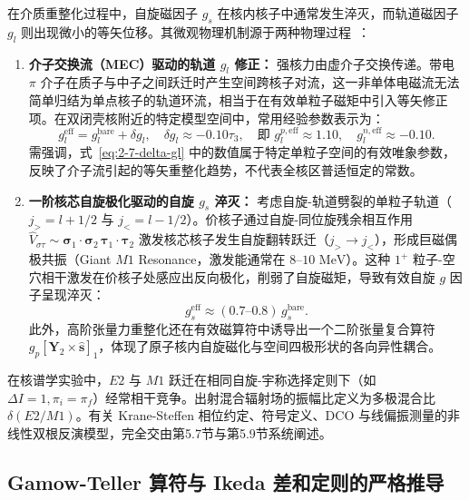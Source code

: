 在介质重整化过程中，自旋磁因子 $g_s$ 在核内核子中通常发生淬灭，而轨道磁因子 $g_l$ 则出现微小的等矢位移。其微观物理机制源于两种物理过程~\cite{book-suhonen-from-nucleons-to-nucleus,book-bohr-mottelson-nuclear-structure}：
\begin{enumerate}
\item \textbf{介子交换流（MEC）驱动的轨道 $g_l$ 修正：} 强核力由虚介子交换传递。带电 $\pi$ 介子在质子与中子之间跃迁时产生空间跨核子对流，这一非单体电磁流无法简单归结为单点核子的轨道环流，相当于在有效单粒子磁矩中引入等矢修正项。在双闭壳核附近的特定模型空间中，常用经验参数表示为：
\begin{equation}\label{eq:2-7-delta-gl}
g_l^{\mathrm{eff}} = g_l^{\mathrm{bare}} + \delta g_l, \quad \delta g_l \approx -0.10 \tau_3, \quad \text{即 } g_l^{p,\mathrm{eff}} \approx 1.10, \quad g_l^{n,\mathrm{eff}} \approx -0.10.
\end{equation}
需强调，式~\eqref{eq:2-7-delta-gl} 中的数值属于特定单粒子空间的有效唯象参数，反映了介子流引起的等矢重整化趋势，不代表全核区普适恒定的常数。
\item \textbf{一阶核芯自旋极化驱动的自旋 $g_s$ 淬灭：} 考虑自旋-轨道劈裂的单粒子轨道（$j_> = l + 1/2$ 与 $j_< = l - 1/2$）。价核子通过自旋-同位旋残余相互作用 $\hat{V}_{\sigma\tau} \sim \boldsymbol{\sigma}_1 \cdot \boldsymbol{\sigma}_2 \, \boldsymbol{\tau}_1 \cdot \boldsymbol{\tau}_2$ 激发核芯核子发生自旋翻转跃迁（$j_> \to j_<$），形成巨磁偶极共振（Giant $M1$ Resonance，激发能通常在 $8\text{--}10\text{ MeV}$）。这种 $1^+$ 粒子-空穴相干激发在价核子处感应出反向极化，削弱了自旋磁矩，导致有效自旋 $g$ 因子呈现淬灭：
\begin{equation}\label{eq:2-7-gs-quench}
g_s^{\mathrm{eff}} \approx (0.7\text{--}0.8) \, g_s^{\mathrm{bare}}.
\end{equation}
此外，高阶张量力重整化还在有效磁算符中诱导出一个二阶张量复合算符 $g_p [\mathbf{Y}_2 \times \hat{\mathbf{s}}]_1$，体现了原子核内自旋磁化与空间四极形状的各向异性耦合。
\end{enumerate}

在核谱学实验中，$E2$ 与 $M1$ 跃迁在相同自旋-宇称选择定则下（如 $\Delta I = 1, \pi_i = \pi_f$）经常相干竞争。出射混合辐射场的振幅比定义为多极混合比 $\delta(E2/M1)$。有关 Krane-Steffen 相位约定、符号定义、DCO 与线偏振测量的非线性双根反演模型，完全交由第5.7节与第5.9节系统阐述。

\subsection{Gamow-Teller 算符与 Ikeda 差和定则的严格推导}\label{sec:2-7-4}

